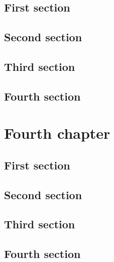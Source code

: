 \documentclass{researchbook}
\begin{document}
\section{First section}\lipsum
\section{Second section}\lipsum
\section{Third section}\lipsum
\section{Fourth section}\lipsum


\chapter{Fourth chapter}

\section{First section}\lipsum
\section{Second section}\lipsum
\section{Third section}\lipsum
\section{Fourth section}\lipsum


\customcover{}{}{}{}
\end{document}
